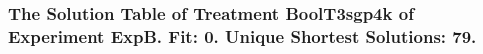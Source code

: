  \begin{frame}
 \fontsize{8pt}{9pt}\selectfont
 \frametitle{ The Solution Table of Treatment BoolT3sgp4k of Experiment ExpB. Fit: 0. Unique Shortest Solutions: 79. }

 \label{ExpBSolutionTable017.tex}  
 \end{frame}

